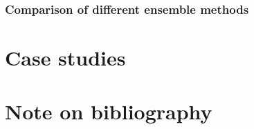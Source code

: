 \begin{refsection}
\begin{remark}
	
\end{remark}


\subsubsection{Comparison of different ensemble methods}


\section{Case studies}


\section{Note on bibliography}

\end{refsection}

